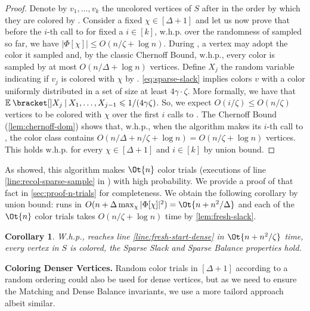 \documentclass[a4paper,english,11pt]{amsart}
\renewcommand{\paragraph}[1]{\medskip\noindent\textbf{#1}}
\newtheorem{corollary}[lemma]{Corollary}
\theoremstyle{definition}
\renewcommand{\leq}{\leqslant}
\newcommand\given{ \nonscript\: \vert{} \nonscript\: \mathopen{} }
\newcommand{\whp}{$\text{w.h.p.}$\xspace}
\begin{document}
\begin{proof}
    Denote by $v_1, \ldots, v_k$ the uncolored vertices of $S$ after \OneShotColoring in the order by which they are colored by \FreshColoring.
    Consider a fixed $\chi\in[\Delta+1]$ and let us now prove that before the $i$-th call to \RecolorSparse for fixed a $i\in[k]$, \whp over the randomness of sampled so far, we have $|\Phi[\chi]| \leq O(n / \zeta + \log n)$.
    During \OneShotColoring, a vertex may adopt the color it sampled and, by the classic Chernoff Bound, \whp, every color is sampled by at most $O(n/\Delta + \log n)$ vertices. Define $X_j$ the random variable indicating if $v_j$ is colored with $\chi$ by \RecolorSparse. \cref{eq:sparse-slack} implies \RecolorSparse colors $v$ with a color uniformly distributed in a set of size at least $4\gamma\cdot \zeta$. More formally, we have that $\Exp{ X_j \given X_1, \ldots, X_{j-1} } \leq 1/(4\gamma \zeta)$. So, we expect $O(i/\zeta) \leq O(n/\zeta)$ vertices to be colored with $\chi$ over the first $i$ calls to \RecolorSparse. The Chernoff Bound (\cref{lem:chernoff-dom}) shows that, \whp, when the algorithm makes its $i$-th call to \RecolorSparse, the color class contains $O(n/\Delta + n/\zeta + \log n) = O(n/\zeta + \log n)$ vertices. This holds \whp for every $\chi \in[\Delta+1]$ and $i\in[k]$ by union bound.
\end{proof}

As \cite[Appendix A.1]{BRW24} showed, this algorithm makes $\Ot{n}$ color trials (executions of line \ref{line:recol-sparse-sample} in \RecolorSparse) with high probability. We provide a proof of that fact in \cref{sec:proof-n-trials} for completeness. We obtain the following corollary by union bound: \OneShotColoring runs in $O(n + \Delta\max_\chi|\Phi[\chi]|^2) = \Ot{ n + n^2 / \Delta }$ and each of the $\Ot{n}$ color trials takes $O(n/\zeta + \log n)$ time by \cref{lem:fresh-slack}.
\begin{corollary}
    \label{cor:fresh-sparse}
    W.h.p., \FreshColoring reaches line \ref{line:fresh-start-dense} in $\Ot{ n + n^2 / \zeta }$ time, every vertex in $S$ is colored, the Sparse Slack and Sparse Balance properties hold.
\end{corollary}

\paragraph{Coloring Denser Vertices.}
Random color trials in $[\Delta+1]$ according to a random ordering could also be used for dense vertices, but as we need to ensure the Matching and Dense Balance invariants, we use a more tailord approach albeit similar.
\end{document}
